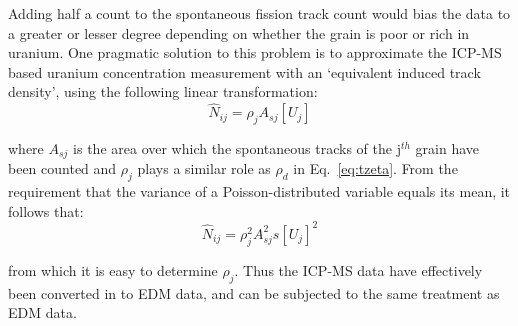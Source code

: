 \begin{refsection}
Adding half a count to the spontaneous fission track count would bias
the data to a greater or lesser degree depending on whether the grain
is poor or rich in uranium. One pragmatic solution to this problem is
to approximate the ICP-MS based uranium concentration measurement with
an `equivalent induced track density', using the following linear
transformation:
\begin{equation}
\hat{N}_{ij} = \rho_j A_{sj} [{U}_j]
\end{equation}

\noindent where $A_{sj}$ is the area over which the spontaneous tracks
of the j$^{th}$ grain have been counted and $\rho_j$ plays a similar
role as $\rho_d$ in Eq.~\ref{eq:tzeta}. From the requirement that the
variance of a Poisson-distributed variable equals its mean, it follows
that:
\begin{equation}
\hat{N}_{ij} = \rho_j^2 A_{sj}^2 s[{U}_j]^2
\end{equation}

\noindent from which it is easy to determine $\rho_j$. Thus the ICP-MS
data have effectively been converted in to EDM data, and can be
subjected to the same treatment as EDM data.

\printbibliography[heading=subbibliography]

\end{refsection}
